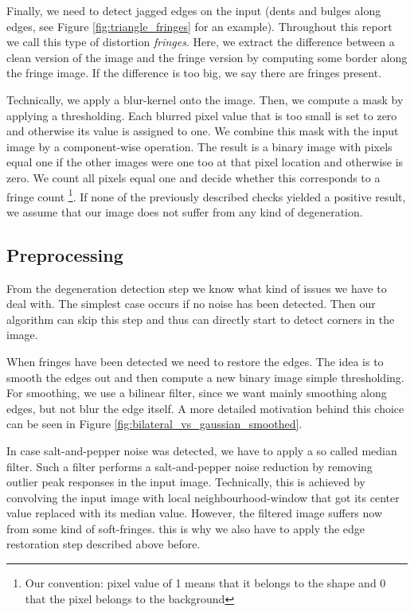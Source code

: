 \documentclass[conference]{IEEEtran}
\begin{document}
Finally, we need to detect jagged edges on the input (dents and bulges along edges, see Figure \ref{fig:triangle_fringes} for an example). 
Throughout this report we call this type of distortion \emph{fringes}. 
Here, we extract the difference between a clean version of the image and the fringe version by computing some border along the fringe image. 
If the difference is too big, we say there are fringes present. 
	
Technically, we apply a blur-kernel onto the image. Then, we compute a mask by applying a thresholding. Each blurred pixel value that is too small is set to zero and otherwise its value is assigned to one. We combine this mask with the input image by a component-wise operation. The result is a binary image with pixels equal one if the other images were one too at that pixel location and otherwise is zero. We count all pixels equal one and decide whether this corresponds to a fringe count \footnote{Our convention: pixel value of 1 means that it belongs to the shape and 0 that the pixel belongs to the background}. If none of the previously described checks yielded a positive result, we assume that our image does not suffer from any kind of degeneration.
  
\subsection{Preprocessing}
From the degeneration detection step we know what kind of issues we have to deal with. The simplest case occurs if no noise has been detected. Then our algorithm can skip this step and thus can directly start to detect corners in the image. 

When fringes have been detected we need to restore the edges.
The idea is to smooth the edges out and then compute a new binary image simple thresholding. 
For smoothing, we use a bilinear filter\cite{TomasiBilateralFiltering}, since we want mainly smoothing along edges, but not blur the edge itself. A more detailed motivation behind this
choice can be seen in Figure \ref{fig:bilateral_vs_gaussian_smoothed}. 

In case salt-and-pepper noise was detected, we have to apply a so called median filter. Such a filter performs a salt-and-pepper noise reduction by removing outlier peak responses in the input image. Technically, this is achieved by convolving the input image with local neighbourhood-window that got its center value replaced with its median value. However, the filtered image suffers now from some kind of soft-fringes. this is why we also have to apply the edge restoration step described above before. 
\end{document}
